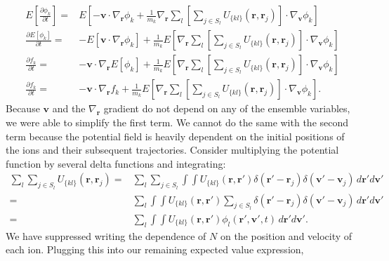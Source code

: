 \documentclass{article}
\begin{document}
\begin{align*}
E\left[\frac{\partial \phi_k}{\partial t}\right]=&E\left[-\mathbf{v}\cdot \nabla_\mathbf{r}\phi_k+\frac{1}{m_k}
\nabla_\mathbf{r}\sum_l\left[\sum_{j\in S_l}U_{\{kl\}}(\mathbf{r},\mathbf{r}_j)\right]\cdot\nabla_\mathbf{v}\phi_k
\right]\\
\frac{\partial E[\phi_k]}{\partial t}=&-E\left[\mathbf{v}\cdot \nabla_\mathbf{r}\phi_k\right]+\frac{1}{m_k}E\left[\nabla_\mathbf{r}\sum_l\left[\sum_{j\in S_l}U_{\{kl\}}(\mathbf{r},\mathbf{r}_j)\right]\cdot\nabla_\mathbf{v}\phi_k\right]\\
\frac{\partial f_k}{\partial t}=&-\mathbf{v}\cdot\nabla_\mathbf{r}E[\phi_k]+\frac{1}{m_k}E\left[\nabla_\mathbf{r}\sum_l\left[\sum_{j\in S_l}U_{\{kl\}}(\mathbf{r},\mathbf{r}_j)\right]\cdot\nabla_\mathbf{v}\phi_k\right]\\
\frac{\partial f_k}{\partial t}=&-\mathbf{v}\cdot\nabla_\mathbf{r} f_k+\frac{1}{m_k}E\left[\nabla_\mathbf{r}\sum_l\left[\sum_{j\in S_l}U_{\{kl\}}(\mathbf{r},\mathbf{r}_j)\right]\cdot\nabla_\mathbf{v}\phi_k\right].
\end{align*}Because $\mathbf{v}$ and the $\nabla_\mathbf{r}$ gradient do not depend on any of the ensemble variables, we were able to simplify the first term. We cannot do the same with the second term because the potential field is heavily dependent on the initial positions of the ions and their subsequent trajectories. Consider multiplying the potential function by several delta functions and integrating:
\begin{align*}
\sum_l\sum_{j\in S_l}U_{\{kl\}}(\mathbf{r},\mathbf{r}_j)=& \sum_l\sum_{j\in S_l}\int\int U_{\{kl\}}(\mathbf{r},\mathbf{r}')\delta(\mathbf{r}'-\mathbf{r}_j)\delta(\mathbf{v}'-\mathbf{v}_j)\,d\mathbf{r}'d\mathbf{v}'\\
=&\sum_l\int\int U_{\{kl\}}(\mathbf{r},\mathbf{r}')\sum_{j\in S_l}\delta(\mathbf{r}'-\mathbf{r}_j)\delta(\mathbf{v}'-\mathbf{v}_j)\,d\mathbf{r}'d\mathbf{v}'\\
=&\sum_l\int\int U_{\{kl\}}(\mathbf{r},\mathbf{r}')\phi_l(\mathbf{r}',\mathbf{v}',t)\,d\mathbf{r}'d\mathbf{v}'.
\end{align*}We have suppressed writing the dependence of $N$ on the position and velocity of each ion. Plugging this into our remaining expected value expression,
\end{document}
